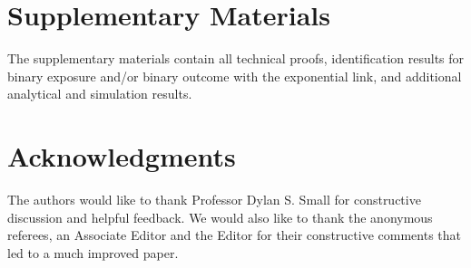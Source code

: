 \documentclass[12pt]{article}
\begin{document}
{ 



\vspace{-5mm}
\section*{Supplementary Materials}
The supplementary materials contain all technical proofs, identification results for binary exposure and/or binary outcome with the exponential link, and additional analytical and simulation results. 

\vspace{-5mm}
\section*{Acknowledgments}
The authors would like to thank Professor Dylan S. Small for constructive discussion and helpful feedback. We would also like to thank the anonymous referees, an Associate Editor and the Editor for their constructive comments that led to a much improved paper.







\clearpage



}
\end{document}
